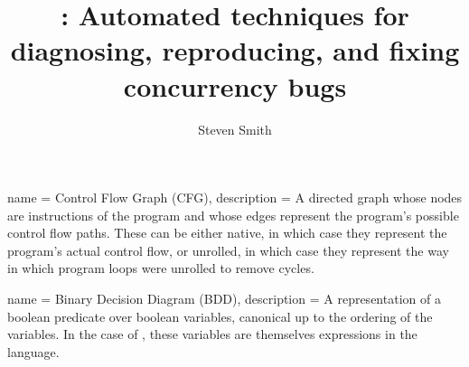 {
  name = Control Flow Graph (CFG),
  description = {A directed graph whose nodes are instructions
    of the program and whose edges represent the program's possible
    control flow paths.  These can be either native, in which
    case they represent the program's actual control flow, or
    unrolled, in which case they represent the way in which program
    loops were unrolled to remove cycles.
  }
}

{
  name = Binary Decision Diagram (BDD),
  description = {A representation of a boolean predicate over boolean
    variables, canonical up to the ordering of the variables.  In the
    case of {\technique}, these variables are themselves expressions in
    the {\StateMachine} language.}
}

    
\makeglossaries

\author{Steven Smith}
\title{{\Technique}: Automated techniques for diagnosing, reproducing, and fixing concurrency bugs}
